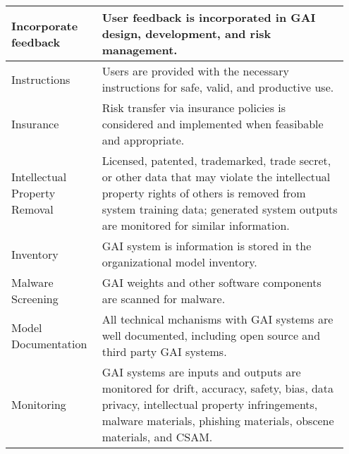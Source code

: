 \documentclass[fleqn]{article}
\begin{document}
\begin{table}[H]
\begin{tabular}{|m{0.25\linewidth} |m{0.70\linewidth} |}
		Incorporate feedback  & User feedback is incorporated in GAI design, development, and risk management.  \\ \hline
		Instructions & Users are provided with the necessary instructions for safe, valid, and productive use. \\ \hline
		Insurance & Risk transfer via insurance policies is considered and implemented when feasibable and appropriate.  \\ \hline
		Intellectual Property Removal & Licensed, patented, trademarked, trade secret, or other data that may violate the intellectual property rights of others is removed from system training data; generated system outputs are monitored for similar information.  \\ \hline
		Inventory & GAI system is information is stored in the organizational model inventory.  \\ \hline
		Malware Screening & GAI weights and other software components are scanned for malware.  \\ \hline
		Model Documentation  & All technical mchanisms with GAI systems are well documented, including open source and third party GAI systems.  \\ \hline
		Monitoring & GAI systems are inputs and outputs are monitored for drift, accuracy, safety, bias, data privacy, intellectual property infringements, malware materials, phishing materials, obscene materials, and CSAM.  \\ \hline
	\end{tabular}
\end{table}		
		
\pagebreak		
	
\end{document}
